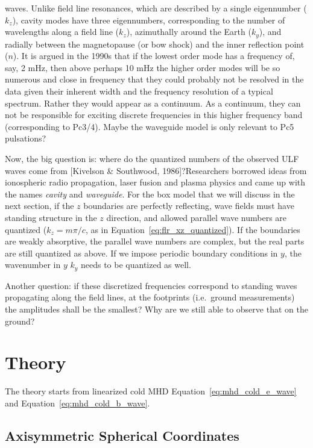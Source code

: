 \documentclass[
  notoc %
]{tufte-book}
\begin{document}
\begin{itemize}
  waves. Unlike field line resonances, which are described by a single
  eigennumber (\(k_z\)), cavity modes have three eigennumbers,
  corresponding to the number of wavelengths along a field line
  (\(k_z\)), azimuthally around the Earth (\(k_y\)), and radially
  between the magnetopause (or bow shock) and the inner reflection point
  (\(n\)). It is argued in the 1990s that if the lowest order mode has a
  frequency of, say, 2 mHz, then above perhaps 10 mHz the higher order
  modes will be so numerous and close in frequency that they could
  probably not be resolved in the data given their inherent width and
  the frequency resolution of a typical spectrum. Rather they would
  appear as a continuum. As a continuum, they can not be responsible for
  exciting discrete frequencies in this higher frequency band
  (corresponding to Pc3/4). Maybe the waveguide model is only relevant
  to Pc5 pulsations?
\end{itemize}

Now, the big question is: where do the quantized numbers of the observed
ULF waves come from {[}Kivelson \& Southwood, 1986{]}?Researchers
borrowed ideas from ionospheric radio propagation, laser fusion and
plasma physics and came up with the names \emph{cavity} and
\emph{waveguide}. For the box model that we will discuss in the next
section, if the \(z\) boundaries are perfectly reflecting, wave fields
must have standing structure in the \(z\) direction, and allowed
parallel wave numbers are quantized (\(k_z = m\pi/c\), as in
Equation~\ref{eq:flr_xz_quantized}). If the boundaries are weakly
absorptive, the parallel wave numbers are complex, but the real parts
are still quantized as above. If we impose periodic boundary conditions
in \(y\), the wavenumber in \(y\) \(k_y\) needs to be quantized as well.

Another question: if these discretized frequencies correspond to
standing waves propagating along the field lines, at the footprints
(i.e.~ground measurements) the amplitudes shall be the smallest? Why are
we still able to observe that on the ground?

\hypertarget{theory}{%
\section{Theory}\label{theory}}

The theory starts from linearized cold MHD
Equation~\ref{eq:mhd_cold_e_wave} and Equation~\ref{eq:mhd_cold_b_wave}.

\hypertarget{axisymmetric-spherical-coordinates}{%
\subsection{Axisymmetric Spherical
Coordinates}\label{axisymmetric-spherical-coordinates}}
\end{document}
